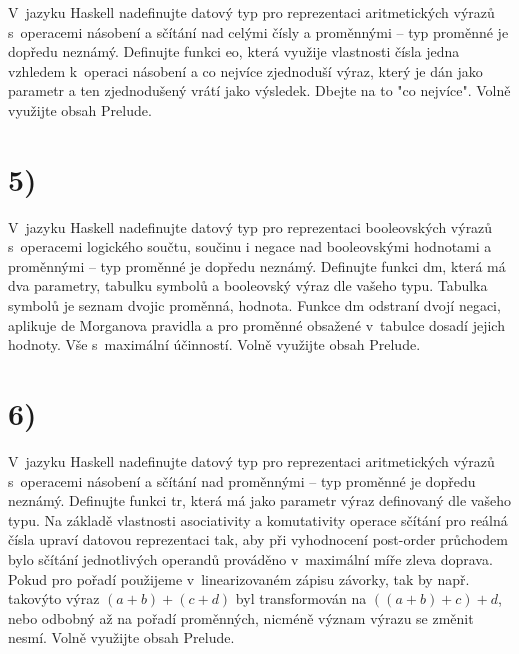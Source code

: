 \documentclass[11pt, a4paper, titlepage]{article}
\begin{document}
V~jazyku Haskell nadefinujte datový typ pro reprezentaci aritmetických výrazů s~operacemi násobení a sčítání nad celými čísly a proměnnými -- typ proměnné je dopředu neznámý. Definujte funkci eo, která využije vlastnosti čísla jedna vzhledem k~operaci násobení a co nejvíce zjednoduší výraz, který je dán jako parametr a ten zjednodušený vrátí jako výsledek. Dbejte na to "co nejvíce". Volně využijte obsah Prelude.

\section*{5)}

V~jazyku Haskell nadefinujte datový typ pro reprezentaci booleovských výrazů s~operacemi logického součtu, součinu i negace nad booleovskými hodnotami a proměnnými -- typ proměnné je dopředu neznámý. Definujte funkci dm, která má dva parametry, tabulku symbolů a booleovský výraz dle vašeho typu. Tabulka symbolů je seznam dvojic proměnná, hodnota. Funkce dm odstraní dvojí negaci, aplikuje de Morganova pravidla a pro proměnné obsažené v~tabulce dosadí jejich hodnoty. Vše s~maximální účinností. Volně využijte obsah Prelude.

\section*{6)}

V~jazyku Haskell nadefinujte datový typ pro reprezentaci aritmetických výrazů s~operacemi násobení a sčítání nad proměnnými -- typ proměnné je dopředu neznámý. Definujte funkci tr, která má jako parametr výraz definovaný dle vašeho typu. Na základě vlastnosti asociativity a komutativity operace sčítání pro reálná čísla upraví datovou reprezentaci tak, aby při vyhodnocení post-order průchodem bylo sčítání jednotlivých operandů prováděno v~maximální míře zleva doprava. Pokud pro pořadí použijeme v~linearizovaném zápisu závorky, tak by např. takovýto výraz $(a+b)+(c+d)$ byl transformován na $((a+b)+c)+d$, nebo odbobný až na pořadí proměnných, nicméně význam výrazu se změnit nesmí. Volně využijte obsah Prelude.

\end{document}
